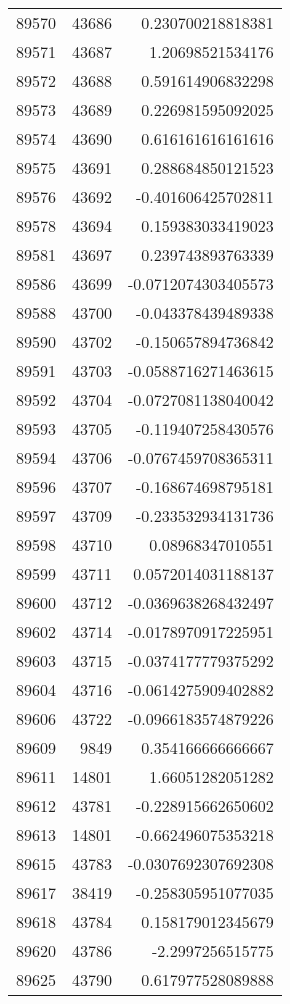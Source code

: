 \begin{tabular}{r | r | r}
89570 & 43686 & 0.230700218818381 \\
89571 & 43687 & 1.20698521534176 \\
89572 & 43688 & 0.591614906832298 \\
89573 & 43689 & 0.226981595092025 \\
89574 & 43690 & 0.616161616161616 \\
89575 & 43691 & 0.288684850121523 \\
89576 & 43692 & -0.401606425702811 \\
89578 & 43694 & 0.159383033419023 \\
89581 & 43697 & 0.239743893763339 \\
89586 & 43699 & -0.0712074303405573 \\
89588 & 43700 & -0.043378439489338 \\
89590 & 43702 & -0.150657894736842 \\
89591 & 43703 & -0.0588716271463615 \\
89592 & 43704 & -0.0727081138040042 \\
89593 & 43705 & -0.119407258430576 \\
89594 & 43706 & -0.0767459708365311 \\
89596 & 43707 & -0.168674698795181 \\
89597 & 43709 & -0.233532934131736 \\
89598 & 43710 & 0.08968347010551 \\
89599 & 43711 & 0.0572014031188137 \\
89600 & 43712 & -0.0369638268432497 \\
89602 & 43714 & -0.0178970917225951 \\
89603 & 43715 & -0.0374177779375292 \\
89604 & 43716 & -0.0614275909402882 \\
89606 & 43722 & -0.0966183574879226 \\
89609 & 9849 & 0.354166666666667 \\
89611 & 14801 & 1.66051282051282 \\
89612 & 43781 & -0.228915662650602 \\
89613 & 14801 & -0.662496075353218 \\
89615 & 43783 & -0.0307692307692308 \\
89617 & 38419 & -0.258305951077035 \\
89618 & 43784 & 0.158179012345679 \\
89620 & 43786 & -2.2997256515775 \\
89625 & 43790 & 0.617977528089888 \\

\end{tabular}
